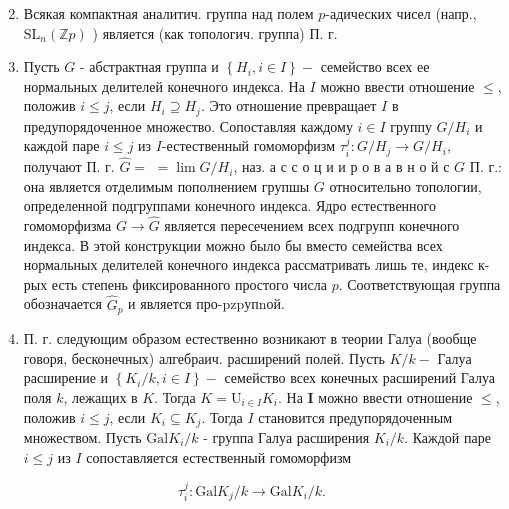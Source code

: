 \documentclass[10pt]{article}
\begin{document}
\begin{enumerate}

  \setcounter{enumi}{1}

  \item Всякая компактная аналитич. группа над полем $p$-адических чисел (напр., $\mathrm{SL}_{n}(\mathbb{Z} p)$ ) является (как топологич. группа) П. г.



  \item Пусть $G$ - абстрактная группа и $\left\{H_{i}, i \in I\right\}-$ семейство всех ее нормальных делителей конечного индекса. На $I$ можно ввести отношение $\leqslant$, положив $i \leqslant j$, если $H_{i} \supseteq H_{j}$. Это отношение превращает $I$ в предупорядоченное множество. Сопоставляя каждому $i \in I$ группу $G / H_{i}$ и каждой паре $i \leqslant j$ из $I$-естественный гомоморфизм $\tau_{i}^{j}: G / H_{j} \rightarrow G / H_{i}$, получают П. г. $\hat{G}=$ $=\lim G / H_{i}$, наз. а с с о ц и и р о в а в н о й с $G$ П. г.: она является отделимым пополнением групшы $G$ относительно топологии, определенной подгруппами конечного индекса. Ядро естественного гомоморфизма $G \rightarrow \hat{G}$ является пересечением всех подгрупп конечного индекса. В этой конструкции можно было бы вместо семейства всех нормальных делителей конечного индекса рассматривать лишь те, индекс к-рых есть степень фиксированного простого числа $p$. Соответствующая группа обозначается $\hat{G}_{p}$ и является про-pzpупnой.



  \item П. г. следующим образом естественно возникают в теории Галуа (вообще говоря, бесконечных) алгебраич. расширений полей. Пусть $K / k-$ Галуа расширение и $\left\{K_{i} / k, i \in I\right\}-$ семейство всех конечных расширений Галуа поля $k$, лежащих в $K$. Тогда $K=\mathrm{U}_{i \in I} K_{i}$. На $\boldsymbol{I}$ можно ввести отношение $\leqslant$, положив $i \leqslant j$, если $K_{i} \subseteq K_{j}$. Тогда $I$ становится предупорядоченным множеством. Пусть $\mathrm{Gal} K_{i} / k$ - группа Галуа расширения $K_{i} / k$. Каждой паре $i \leqslant j$ из $I$ сопоставляется естественный гомоморфизм



\end{enumerate}



\[

\tau_{i}^{j}: \mathrm{Gal} K_{j} / k \longrightarrow \mathrm{Gal} K_{i} / k .

\]
\end{document}
